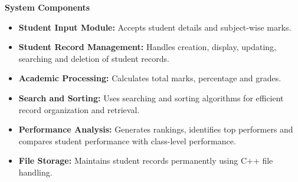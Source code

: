 \documentclass[11pt,a4paper]{article}
\begin{document}
\vspace{8mm}
\begin{center}
\end{center}

\vspace{8mm}
\begin{answerbox}
\textbf{System Components}

\begin{itemize}[leftmargin=7mm,itemsep=2pt,topsep=3pt,parsep=0pt]
\item \textbf{Student Input Module:} Accepts student details and subject-wise marks.
\item \textbf{Student Record Management:} Handles creation, display, updating, searching and deletion of student records.
\item \textbf{Academic Processing:} Calculates total marks, percentage and grades.
\item \textbf{Search and Sorting:} Uses searching and sorting algorithms for efficient record organization and retrieval.
\item \textbf{Performance Analysis:} Generates rankings, identifies top performers and compares student performance with class-level performance.
\item \textbf{File Storage:} Maintains student records permanently using C++ file handling.
\end{itemize}
\end{answerbox}

\newpage
\end{document}
